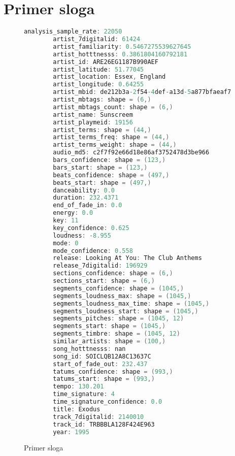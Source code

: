 \section{Primer sloga}
\label{sec:DodatakPrimer}

\begin{figure}[H]
    \lstset{style=mystyle}
    \begin{lstlisting}[language=C, basicstyle=\footnotesize, numbers=none]
        analysis_sample_rate: 22050
        artist_7digitalid: 61424
        artist_familiarity: 0.5467275539627645
        artist_hotttnesss: 0.3861804160792181
        artist_id: ARE26EG1187B990AEF
        artist_latitude: 51.77045
        artist_location: Essex, England
        artist_longitude: 0.64255
        artist_mbid: de212b3a-2f54-4def-a13d-5a877bfaeaf7
        artist_mbtags: shape = (6,)
        artist_mbtags_count: shape = (6,)
        artist_name: Sunscreem
        artist_playmeid: 19156
        artist_terms: shape = (44,)
        artist_terms_freq: shape = (44,)
        artist_terms_weight: shape = (44,)
        audio_md5: c2f7f92e66d18e86af3752478d3be966
        bars_confidence: shape = (123,)
        bars_start: shape = (123,)
        beats_confidence: shape = (497,)
        beats_start: shape = (497,)
        danceability: 0.0
        duration: 232.4371
        end_of_fade_in: 0.0
        energy: 0.0
        key: 11
        key_confidence: 0.625
        loudness: -8.955
        mode: 0
        mode_confidence: 0.558
        release: Looking At You: The Club Anthems
        release_7digitalid: 196929
        sections_confidence: shape = (6,)
        sections_start: shape = (6,)
        segments_confidence: shape = (1045,)
        segments_loudness_max: shape = (1045,)
        segments_loudness_max_time: shape = (1045,)
        segments_loudness_start: shape = (1045,)
        segments_pitches: shape = (1045, 12)
        segments_start: shape = (1045,)
        segments_timbre: shape = (1045, 12)
        similar_artists: shape = (100,)
        song_hotttnesss: nan
        song_id: SOICLQB12A8C13637C
        start_of_fade_out: 232.437
        tatums_confidence: shape = (993,)
        tatums_start: shape = (993,)
        tempo: 130.201
        time_signature: 4
        time_signature_confidence: 0.0
        title: Exodus
        track_7digitalid: 2140010
        track_id: TRBBBLA128F424E963
        year: 1995
    \end{lstlisting}
    \caption{Primer sloga}
    \label{primer:Song}
\end{figure}
